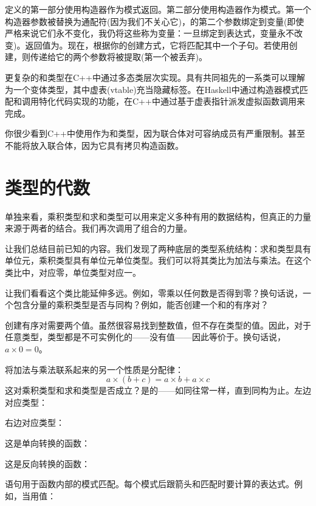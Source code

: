 定义的第一部分使用构造器作为模式返回。第二部分使用构造器作为模式。第一个构造器参数被替换为通配符(因为我们不关心它)，的第二个参数绑定到变量(即使严格来说它们永不变化，我仍将这些称为变量：一旦绑定到表达式，变量永不改变)。返回值为。现在，根据你的创建方式，它将匹配其中一个子句。若使用创建，则传递给它的两个参数将被提取(第一个被丢弃)。

更复杂的和类型在C++中通过多态类层次实现。具有共同祖先的一系类可以理解为一个变体类型，其中虚表(vtable)充当隐藏标签。在Haskell中通过构造器模式匹配和调用特化代码实现的功能，在C++中通过基于虚表指针派发虚拟函数调用来完成。

你很少看到C++中使用作为和类型，因为联合体对可容纳成员有严重限制。甚至不能将放入联合体，因为它具有拷贝构造函数。

\section{类型的代数}

单独来看，乘积类型和求和类型可以用来定义多种有用的数据结构，但真正的力量来源于两者的结合。我们再次调用了组合的力量。

让我们总结目前已知的内容。我们发现了两种底层的类型系统结构：求和类型具有单位元，乘积类型具有单位元单位类型\code{()}。我们可以将其类比为加法与乘法。在这个类比中，对应零，单位类型\code{()}对应一。

让我们看看这个类比能延伸多远。例如，零乘以任何数是否得到零？换句话说，一个包含分量的乘积类型是否与同构？例如，能否创建一个和的有序对？

创建有序对需要两个值。虽然很容易找到整数值，但不存在类型的值。因此，对于任意类型，类型都是不可实例化的——没有值——因此等价于。换句话说，$a \times 0 = 0$。

将加法与乘法联系起来的另一个性质是分配律：
$$a \times (b + c) = a \times b + a \times c$$
这对乘积类型和求和类型是否成立？是的——如同往常一样，直到同构为止。左边对应类型：

右边对应类型：

这是单向转换的函数：

这是反向转换的函数：

语句用于函数内部的模式匹配。每个模式后跟箭头和匹配时要计算的表达式。例如，当用值：

